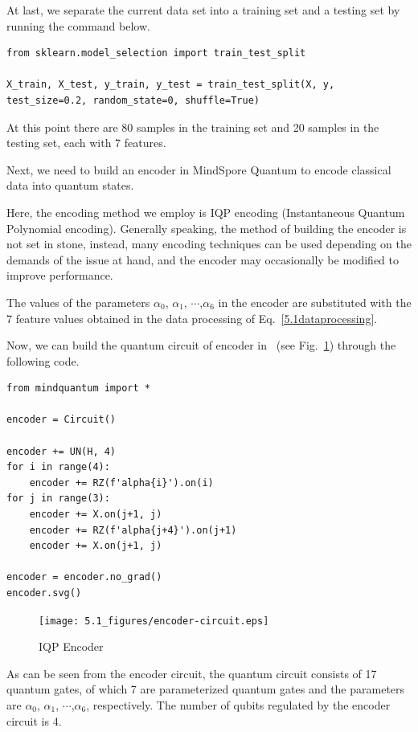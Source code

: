 At last, we separate the current data set into a training set and a testing set by running the command below.

\begin{lstlisting}
from sklearn.model_selection import train_test_split

X_train, X_test, y_train, y_test = train_test_split(X, y, test_size=0.2, random_state=0, shuffle=True)
\end{lstlisting}

At this point there are 80 samples in the training set and 20 samples in the testing set, each with 7 features.

Next, we need to build an encoder in MindSpore Quantum to encode classical data into quantum states.

Here, the encoding method we employ is IQP encoding (Instantaneous Quantum Polynomial encoding). Generally speaking, the method of building the encoder is not set in stone, instead, many encoding techniques can be used depending on the demands of the issue at hand, and the encoder may occasionally be modified to improve performance.

The values of the parameters $\alpha_0$, $\alpha_1$, $\cdots$,$\alpha_6$ in the encoder are substituted with the 7 feature values obtained in the data processing of Eq.~\eqref{5.1dataprocessing}.

Now, we can build the quantum circuit of encoder in \MindQuantum\ (see Fig.~\ref{5.1encoder-circuit}) through the following code.

\begin{lstlisting}
from mindquantum import *

encoder = Circuit()

encoder += UN(H, 4)
for i in range(4):
    encoder += RZ(f'alpha{i}').on(i)
for j in range(3):
    encoder += X.on(j+1, j)
    encoder += RZ(f'alpha{j+4}').on(j+1)
    encoder += X.on(j+1, j)

encoder = encoder.no_grad()
encoder.svg()
\end{lstlisting}

\begin{figure}[H]
    \centering
    \texttt{[image: 5.1\_figures/encoder-circuit.eps]}
    \caption{IQP Encoder}
    \label{5.1encoder-circuit}
\end{figure}

As can be seen from the encoder circuit, the quantum circuit consists of 17 quantum gates, of which 7 are
parameterized quantum gates and the parameters are $\alpha_0$, $\alpha_1$, $\cdots$,$\alpha_6$, respectively. The number of qubits regulated by the encoder circuit is 4.

